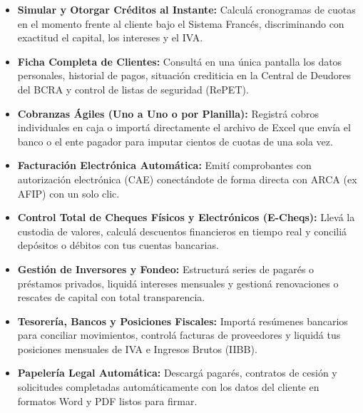 \documentclass[12pt,a4paper]{article}
\renewcommand{\_}{\textunderscore\allowbreak}
\begin{document}
\begin{itemize}
    \item \textbf{Simular y Otorgar Créditos al Instante:} Calculá cronogramas de cuotas en el momento frente al cliente bajo el Sistema Francés, discriminando con exactitud el capital, los intereses y el IVA.
    \item \textbf{Ficha Completa de Clientes:} Consultá en una única pantalla los datos personales, historial de pagos, situación crediticia en la Central de Deudores del BCRA y control de listas de seguridad (RePET).
    \item \textbf{Cobranzas Ágiles (Uno a Uno o por Planilla):} Registrá cobros individuales en caja o importá directamente el archivo de Excel que envía el banco o el ente pagador para imputar cientos de cuotas de una sola vez.
    \item \textbf{Facturación Electrónica Automática:} Emití comprobantes con autorización electrónica (CAE) conectándote de forma directa con ARCA (ex AFIP) con un solo clic.
    \item \textbf{Control Total de Cheques Físicos y Electrónicos (E-Cheqs):} Llevá la custodia de valores, calculá descuentos financieros en tiempo real y conciliá depósitos o débitos con tus cuentas bancarias.
    \item \textbf{Gestión de Inversores y Fondeo:} Estructurá series de pagarés o préstamos privados, liquidá intereses mensuales y gestioná renovaciones o rescates de capital con total transparencia.
    \item \textbf{Tesorería, Bancos y Posiciones Fiscales:} Importá resúmenes bancarios para conciliar movimientos, controlá facturas de proveedores y liquidá tus posiciones mensuales de IVA e Ingresos Brutos (IIBB).
    \item \textbf{Papelería Legal Automática:} Descargá pagarés, contratos de cesión y solicitudes completadas automáticamente con los datos del cliente en formatos Word y PDF listos para firmar.
\end{itemize}

\newpage
\end{document}
